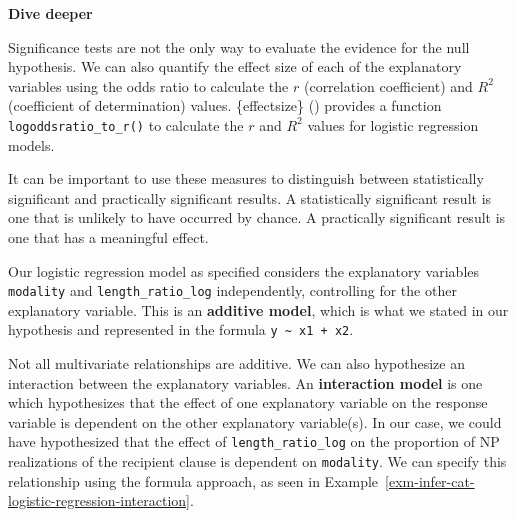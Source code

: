 \documentclass[
  letterpaper,
  krantz1]{latex/krantz-mod}
\theoremstyle{definition}
\theoremstyle{definition}
\theoremstyle{remark}
\begin{document}
\begin{tcolorbox}[enhanced jigsaw, toprule=.15mm, breakable, colback=white, arc=.35mm, left=2mm, colframe=quarto-callout-color-frame, opacityback=0, bottomrule=.15mm, rightrule=.15mm, leftrule=.75mm]

\textbf{ Dive deeper}

Significance tests are not the only way to evaluate the evidence for the
null hypothesis. We can also quantify the effect size
of each of the explanatory variables using the odds ratio to calculate
the \(r\) (correlation coefficient) and \(R^2\)
(coefficient of determination) values. \{effectsize\}
() provides a
function \texttt{logoddsratio\_to\_r()} to calculate the \(r\) and
\(R^2\) values for logistic regression models.

It can be important to use these measures to distinguish between
statistically significant and practically significant results. A
statistically significant result is one that is unlikely to have
occurred by chance. A practically significant result is one that has a
meaningful effect.

\end{tcolorbox}

Our logistic regression model as specified considers the explanatory
variables \texttt{modality} and \texttt{length\_ratio\_log}
independently, controlling for the other explanatory variable. This is
an \textbf{additive model}, which is what we
stated in our hypothesis and represented in the formula
\texttt{y\ \textasciitilde{}\ x1\ +\ x2}.

Not all multivariate relationships are additive. We can also hypothesize
an interaction between the explanatory variables. An \textbf{interaction
model} is one which hypothesizes that the
effect of one explanatory variable on the response variable is dependent
on the other explanatory variable(s). In our case, we could have
hypothesized that the effect of \texttt{length\_ratio\_log} on the
proportion of NP realizations of the recipient clause is dependent on
\texttt{modality}. We can specify this relationship using the formula
approach, as seen in
Example~\ref{exm-infer-cat-logistic-regression-interaction}.
\end{document}
